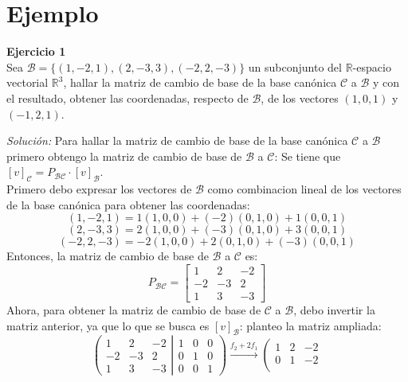 \documentclass{article}
\newenvironment{problem}[2][Ejercicio]
    { \begin{mdframed}[backgroundcolor=gray!20] \textbf{#1 #2} \\}
    {  \end{mdframed}}
\newenvironment{solution}
    {\textit{Solución:}}
    {}
\begin{document}
\section*{Ejemplo}
\begin{problem}{1}
    Sea $\mathcal{B}= \{ (1,-2,1),(2,-3,3), (-2,2,-3) \}$ un subconjunto del $\mathbb{R}$-espacio vectorial $\mathbb{R}^3$, hallar la matriz de cambio de base de la base canónica $\mathcal{C}$ a $\mathcal{B}$ y con el resultado, obtener las coordenadas, respecto de $\mathcal{B}$, de los vectores $(1,0,1)$ y $(-1,2,1)$.
\end{problem}
\begin{solution}
    Para hallar la matriz de cambio de base de la base canónica $\mathcal{C}$ a $\mathcal{B}$ primero obtengo la matriz de cambio de base de $\mathcal{B}$ a $\mathcal{C}$:
    Se tiene que $[v]_{\mathcal{C}} = P_{\mathcal{B} \mathcal{C}} \cdot [v]_{\mathcal{B}}$. \\
    Primero debo expresar los vectores de $\mathcal{B}$ como combinacion lineal de los vectores de la base canónica para obtener las coordenadas:
    $$
    (1,-2,1) = 1(1,0,0)+(-2)(0,1,0)+1(0,0,1)
    $$
    $$
    (2,-3,3) = 2(1,0,0)+(-3)(0,1,0)+3(0,0,1)
    $$
    $$
    (-2,2,-3) = -2(1,0,0)+2(0,1,0)+(-3)(0,0,1)
    $$
    Entonces, la matriz de cambio de base de $\mathcal{B}$ a $\mathcal{C}$ es:
$$
P_{\mathcal{B} \mathcal{C}} = \begin{bmatrix}
    1 & 2 & -2 \\
    -2 & -3 & 2 \\
    1 & 3 & -3
\end{bmatrix}
$$
Ahora, para obtener la matriz de cambio de base de $\mathcal{C}$ a $\mathcal{B}$, debo invertir la matriz anterior, ya que lo que se busca es $[v]_{\mathcal{B}}$:
planteo la matriz ampliada:
$$
\left ( \left.\begin{matrix}
    1 & 2 & -2 \\ 
    -2 & -3 & 2 \\ 
    1 & 3 & -3
    \end{matrix}\right| \begin{matrix}
    1 & 0 & 0 \\ 
    0 & 1 & 0 \\ 
    0 & 0 & 1
    \end{matrix}\right )
\xrightarrow[]{f_2+2f_1}
\left ( \left.\begin{matrix}
    1 & 2 & -2 \\ 
    0 & 1 & -2 \\ 

\end{matrix}$$
\end{solution}
\end{document}
